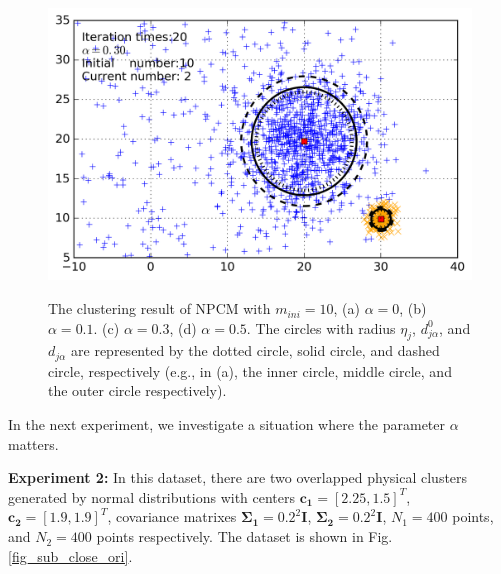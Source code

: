 \documentclass[journal]{IEEEtran}
\theoremstyle{definition}
\begin{document}
\begin{figure}[tb]
    {\includegraphics[width=\columnwidth]{img/small_cluster_structure_preserve_last_frame_n_10_alpha_0_3.png}\label{fig_sub_small_0_3}}
   \quad
\caption{The clustering result of NPCM with $m_{ini}=10$, (a) $\alpha=0$, (b) $\alpha=0.1.$ (c) $\alpha=0.3$, (d) $\alpha=0.5$.
The circles with radius $\eta_j$, $d_{j\alpha}^0$, and $d_{j\alpha}$ are represented by the dotted circle, solid circle, and dashed circle, respectively (e.g., in (a), the inner circle, middle circle, and the outer circle respectively).}
\label{fig_small_cluster}
\end{figure}

In the next experiment, we investigate a situation where the parameter $\alpha$ matters.

\textbf{Experiment 2:} In this dataset, there are two overlapped physical clusters generated by normal distributions with centers $\mathbf{c_1}=[2.25, 1.5]^T$, $\mathbf{c_2}=[1.9, 1.9]^T$, covariance matrixes $\mathbf{\Sigma_1}=0.2^2\mathbf{I}$, $\mathbf{\Sigma_2}=0.2^2\mathbf{I}$, $N_1=400$ points, and $N_2=400$ points  respectively. The dataset is shown in Fig.\ref{fig_sub_close_ori}.
\end{document}
